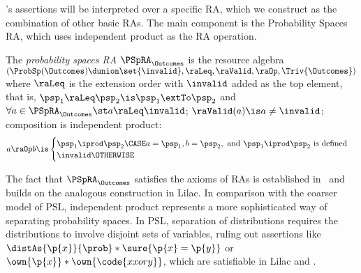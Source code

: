 \thelogic's assertions will be interpreted over a specific RA,
which we construct as the combination of other basic RAs.
The main component is the Probability Spaces RA,
which uses independent product as the RA operation.

\begin{definition}
  The \emph{probability spaces RA}
  $ \PSpRA_\Outcomes $
  is the resource algebra
  ${(\ProbSp(\Outcomes) \dunion \set{\invalid}, \raLeq, \raValid, \raOp, \Triv{\Outcomes})}$
  where
  $\raLeq$ is the extension order with $\invalid$ added as the top element,
  that is,
    $ \psp_1 \raLeq \psp_2 \is \psp_1 \extTo \psp_2 $ and
    $ \forall a \in \PSpRA_\Outcomes\st
        a \raLeq \invalid$;
  $\raValid(a) \is a \neq \invalid$;
  composition is independent product:\[
    a \raOp b \is
      \begin{cases}
        \psp_1 \iprod \psp_2
          \CASE a=\psp_1, b=\psp_2, \text{ and }
                \psp_1 \iprod \psp_2 \text{ is defined}
        \\
        \invalid \OTHERWISE
      \end{cases}
  \]
\end{definition}

The fact that $\PSpRA_\Outcomes$ satisfies the axioms of RAs is
established in~ and builds on the analogous
construction in Lilac.
In comparison with the coarser model of PSL,
independent product represents a more sophisticated way of separating
probability spaces.
In PSL, separation of distributions requires the distributions to
involve disjoint sets of variables, ruling out
assertions like
$ \distAs{\p{x}}{\prob} * \sure{\p{x}=\p{y}} $
or
$ \own{\p{x}} * \own{\code{x xor y}} $,
which are satisfiable in Lilac and \thelogic.

